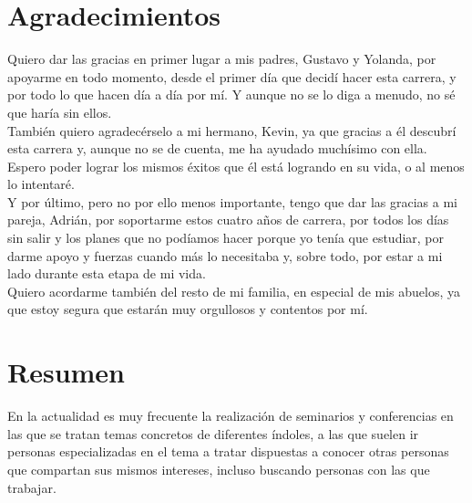 \documentclass[a4paper, 12pt]{book}
\begin{document}

\chapter*{Agradecimientos}
Quiero dar las gracias en primer lugar a mis padres, Gustavo y Yolanda, por apoyarme en todo momento, desde el primer día que decidí hacer esta carrera, y por todo lo que hacen día a día por mí. Y aunque no se lo diga a menudo, no sé que haría sin ellos.\\

También quiero agradecérselo a mi hermano, Kevin, ya que gracias a él descubrí esta carrera y, aunque no se de cuenta, me ha ayudado muchísimo con ella. Espero poder lograr los mismos éxitos que él está logrando en su vida, o al menos lo intentaré.\\

Y por último, pero no por ello menos importante, tengo que dar las gracias a mi pareja, Adrián, por soportarme estos cuatro años de carrera, por todos los días sin salir y los planes que no podíamos hacer porque yo tenía que estudiar, por darme apoyo y fuerzas cuando más lo necesitaba y, sobre todo, por estar a mi lado durante esta etapa de mi vida.\\

Quiero acordarme también del resto de mi familia, en especial de mis abuelos, ya que estoy segura que estarán muy orgullosos y contentos por mí.



\chapter*{Resumen}
En la actualidad es muy frecuente la realización de seminarios y conferencias en las que se tratan temas concretos de diferentes índoles, a las que suelen ir personas especializadas en el tema a tratar dispuestas a conocer otras personas que compartan sus mismos intereses, incluso buscando personas con las que trabajar.\\
\end{document}
